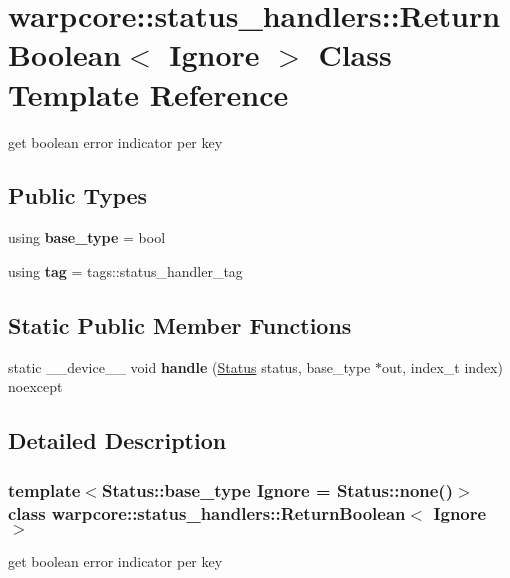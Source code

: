 \hypertarget{classwarpcore_1_1status__handlers_1_1ReturnBoolean}{}\section{warpcore\+:\+:status\+\_\+handlers\+:\+:Return\+Boolean$<$ Ignore $>$ Class Template Reference}
\label{classwarpcore_1_1status__handlers_1_1ReturnBoolean}


get boolean error indicator per key  


\subsection*{Public Types}
\begin{DoxyCompactItemize}
\item 
\mbox{\label{classwarpcore_1_1status__handlers_1_1ReturnBoolean_a885ffca419f7ddd1207042efc7dc989d}} 
using {\bfseries base\+\_\+type} = bool
\item 
\mbox{\label{classwarpcore_1_1status__handlers_1_1ReturnBoolean_a6162de3ab97c98183f97f9ecdb341363}} 
using {\bfseries tag} = tags\+::status\+\_\+handler\+\_\+tag
\end{DoxyCompactItemize}
\subsection*{Static Public Member Functions}
\begin{DoxyCompactItemize}
\item 
\mbox{\label{classwarpcore_1_1status__handlers_1_1ReturnBoolean_a940ef121b25a49f172f5cf369477c799}} 
static \+\_\+\+\_\+device\+\_\+\+\_\+ void {\bfseries handle} (\hyperlink{classwarpcore_1_1Status}{Status} status, base\+\_\+type $\ast$out, index\+\_\+t index) noexcept
\end{DoxyCompactItemize}


\subsection{Detailed Description}
\subsubsection*{template$<$Status\+::base\+\_\+type Ignore = Status\+::none()$>$\newline
class warpcore\+::status\+\_\+handlers\+::\+Return\+Boolean$<$ Ignore $>$}

get boolean error indicator per key 